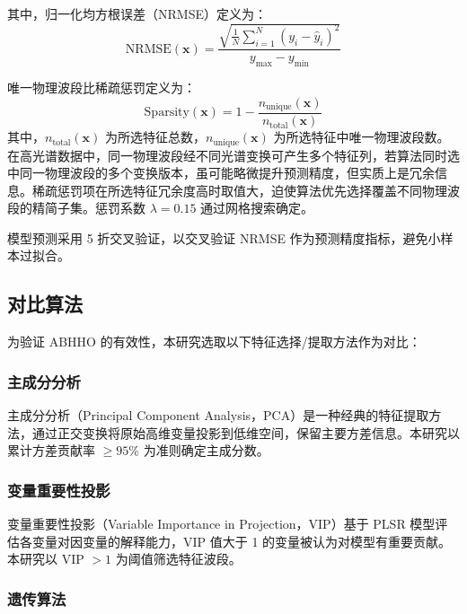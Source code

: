 \documentclass[12pt,a4paper]{article}
\begin{document}
其中，归一化均方根误差（NRMSE）定义为：
\begin{equation}
    \mathrm{NRMSE}(\mathbf{x}) = \frac{\sqrt{\frac{1}{N}\sum_{i=1}^{N}(y_i - \hat{y}_i)^2}}{y_{\max} - y_{\min}}
    \label{eq:nrmse}
\end{equation}

唯一物理波段比稀疏惩罚定义为：
\begin{equation}
    \mathrm{Sparsity}(\mathbf{x}) = 1 - \frac{n_{\mathrm{unique}}(\mathbf{x})}{n_{\mathrm{total}}(\mathbf{x})}
    \label{eq:sparsity}
\end{equation}
其中，$n_{\mathrm{total}}(\mathbf{x})$ 为所选特征总数，$n_{\mathrm{unique}}(\mathbf{x})$ 为所选特征中唯一物理波段数。在高光谱数据中，同一物理波段经不同光谱变换可产生多个特征列，若算法同时选中同一物理波段的多个变换版本，虽可能略微提升预测精度，但实质上是冗余信息。稀疏惩罚项在所选特征冗余度高时取值大，迫使算法优先选择覆盖不同物理波段的精简子集。惩罚系数 $\lambda = 0.15$ 通过网格搜索确定。

模型预测采用 5 折交叉验证，以交叉验证 NRMSE 作为预测精度指标，避免小样本过拟合。

\subsection{对比算法}

为验证 ABHHO 的有效性，本研究选取以下特征选择/提取方法作为对比：

\subsubsection{主成分分析}

主成分分析（Principal Component Analysis，PCA）是一种经典的特征提取方法，通过正交变换将原始高维变量投影到低维空间，保留主要方差信息。本研究以累计方差贡献率 $\geq 95\%$ 为准则确定主成分数。

\subsubsection{变量重要性投影}

变量重要性投影（Variable Importance in Projection，VIP）基于 PLSR 模型评估各变量对因变量的解释能力，VIP 值大于 1 的变量被认为对模型有重要贡献。本研究以 VIP $> 1$ 为阈值筛选特征波段。

\subsubsection{遗传算法}
\end{document}
